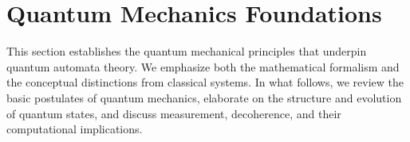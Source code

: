 \section{Quantum Mechanics Foundations}
\label{sec:quantum-foundations}

This section establishes the quantum mechanical principles that underpin quantum automata theory. We emphasize both the mathematical formalism and the conceptual distinctions from classical systems. In what follows, we review the basic postulates of quantum mechanics, elaborate on the structure and evolution of quantum states, and discuss measurement, decoherence, and their computational implications.





 
    
